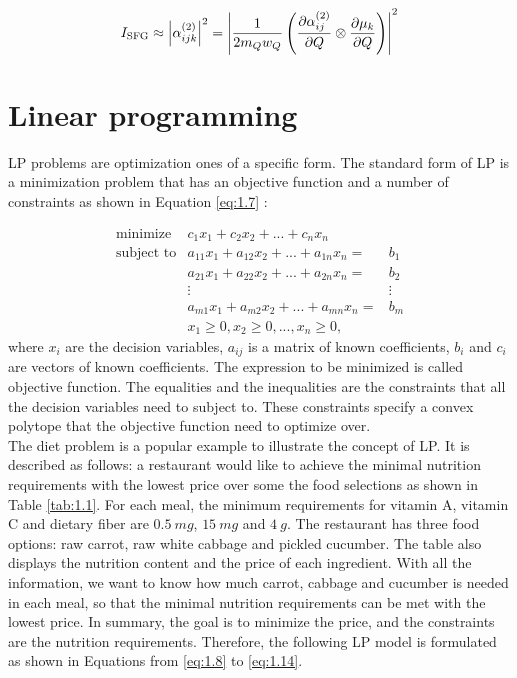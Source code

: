 \begin{equation} \label{eq:1.6}
I_{\rm SFG} \approx \left| \alpha^{(2)}_{ijk} \right|^{2}
= \left| \frac{1}{2m_{Q}w_{Q}} \left( \frac{\partial\alpha^{(2)}_{ij}}{\partial Q} \otimes \frac{\partial\mu_{k}}{\partial Q} \right) \right|^{2}
\end{equation}

\section{Linear programming}
LP problems are optimization ones of a specific form. The standard form of LP is a minimization problem that has an objective function and a number of constraints as shown in Equation \ref{eq:1.7} \cite{UULP}:

\begin{eqnarray}  \label{eq:1.7}
 \text{minimize} & c_{1}x_{1} + c_{2}x_{2} + ... + c_{n} x_{n}  \nonumber \\
 \text{subject to} & a_{11} x_{1} + a_{12} x_{2}+ ... + a_{1n} x_{n} = & b_{1} \nonumber \\
& a_{21} x_{1} + a_{22} x_{2} + ... + a_{2n} x_{n} = & b_{2} \nonumber \\
&\vdots                                   &\vdots \nonumber \\
& a_{m1} x_{1} + a_{m2} x_{2} + ... + a_{mn} x_{n} = & b_{m} \nonumber \\
& x_{1} \geq 0, x_{2} \geq 0, ... ,x_{n} \geq 0, 
\end{eqnarray} 
where $x_{i}$ are the decision variables, $a_{ij}$ is a matrix of known coefficients, $b_{i}$ and $c_{i}$ are vectors of known coefficients. The expression to be minimized is called objective function. The equalities and the inequalities are the constraints that all the decision variables need to subject to. These constraints specify a convex polytope that the objective function need to optimize over. \\ 

The diet problem is a popular example to illustrate the concept of LP. It is described as follows: a restaurant would like to achieve the minimal nutrition requirements with the lowest price over some the food selections as shown in Table \ref{tab:1.1}. For each meal, the minimum requirements for vitamin A, vitamin C and dietary fiber are $0.5~mg$, $15~mg$ and $4~g$. The restaurant has three food options: raw carrot, raw white cabbage and pickled cucumber. The table also displays the nutrition content and the price of each ingredient. With all the information, we want to know how much carrot, cabbage and cucumber is needed in each meal, so that the minimal nutrition requirements can be met with the lowest price. In summary, the goal is to minimize the price, and the constraints are the nutrition requirements. Therefore, the following LP model is formulated as shown in Equations from \ref{eq:1.8} to \ref{eq:1.14}.

